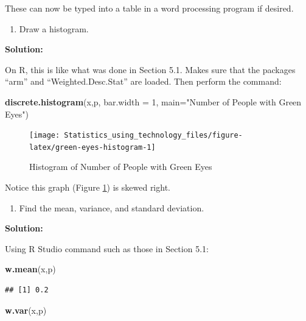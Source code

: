 \documentclass[
]{book}
\newenvironment{Shaded}{\begin{snugshade}}{\end{snugshade}}
\newcommand{\DataTypeTok}[1]{\textcolor[rgb]{0.13,0.29,0.53}{#1}}
\newcommand{\DecValTok}[1]{\textcolor[rgb]{0.00,0.00,0.81}{#1}}
\newcommand{\KeywordTok}[1]{\textcolor[rgb]{0.13,0.29,0.53}{\textbf{#1}}}
\newcommand{\NormalTok}[1]{#1}
\newcommand{\StringTok}[1]{\textcolor[rgb]{0.31,0.60,0.02}{#1}}
\providecommand{\tightlist}{%
  \setlength{\itemsep}{0pt}\setlength{\parskip}{0pt}}
\begin{document}
These can now be typed into a table in a word processing program if desired.

\begin{enumerate}
\def\labelenumi{\alph{enumi}.}
\setcounter{enumi}{2}
\tightlist
\item
  Draw a histogram.
\end{enumerate}

\textbf{Solution:}

On R, this is like what was done in Section 5.1. Makes sure that the packages ``arm'' and ``Weighted.Desc.Stat'' are loaded. Then perform the command:



\begin{Shaded}
\begin{Highlighting}[]
\KeywordTok{discrete.histogram}\NormalTok{(x,p, }\DataTypeTok{bar.width =} \DecValTok{1}\NormalTok{, }\DataTypeTok{main=}\StringTok{"Number of People with Green Eyes"}\NormalTok{)}
\end{Highlighting}
\end{Shaded}

\begin{figure}
\texttt{[image: Statistics\_using\_technology\_files/figure-latex/green-eyes-histogram-1]} \caption{Histogram of Number of People with Green Eyes}\label{fig:green-eyes-histogram}
\end{figure}

Notice this graph (Figure \ref{fig:green-eyes-histogram}) is skewed right.

\begin{enumerate}
\def\labelenumi{\alph{enumi}.}
\setcounter{enumi}{3}
\tightlist
\item
  Find the mean, variance, and standard deviation.
\end{enumerate}

\textbf{Solution:}

Using R Studio command such as those in Section 5.1:

\begin{Shaded}
\begin{Highlighting}[]
\KeywordTok{w.mean}\NormalTok{(x,p)}
\end{Highlighting}
\end{Shaded}

\begin{verbatim}
## [1] 0.2
\end{verbatim}

\begin{Shaded}
\begin{Highlighting}[]
\KeywordTok{w.var}\NormalTok{(x,p)}
\end{Highlighting}
\end{Shaded}
\end{document}
